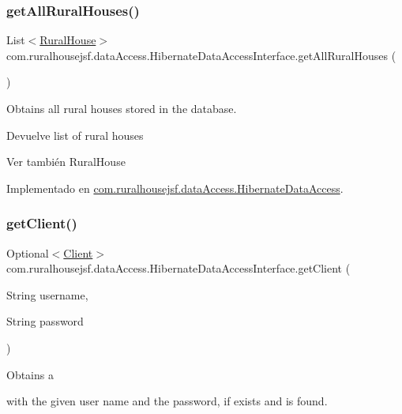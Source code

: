 \subsubsection{\texorpdfstring{getAllRuralHouses()}{getAllRuralHouses()}}
{\footnotesize\ttfamily List$<$\mbox{\hyperlink{classcom_1_1ruralhousejsf_1_1domain_1_1_rural_house}{Rural\+House}}$>$ com.\+ruralhousejsf.\+data\+Access.\+Hibernate\+Data\+Access\+Interface.\+get\+All\+Rural\+Houses (\begin{DoxyParamCaption}{ }\end{DoxyParamCaption})}

Obtains all rural houses stored in the database.

\begin{DoxyReturn}{Devuelve}
list of rural houses
\end{DoxyReturn}
\begin{DoxySeeAlso}{Ver también}
Rural\+House 
\end{DoxySeeAlso}


Implementado en \mbox{\hyperlink{classcom_1_1ruralhousejsf_1_1data_access_1_1_hibernate_data_access_acb92be47dc680218ff3102addce8ae8f}{com.\+ruralhousejsf.\+data\+Access.\+Hibernate\+Data\+Access}}.

\mbox{\label{interfacecom_1_1ruralhousejsf_1_1data_access_1_1_hibernate_data_access_interface_abf581529aefd317dffd1d2ca0906c3ac}} 
\subsubsection{\texorpdfstring{getClient()}{getClient()}}
{\footnotesize\ttfamily Optional$<$\mbox{\hyperlink{classcom_1_1ruralhousejsf_1_1domain_1_1_client}{Client}}$>$ com.\+ruralhousejsf.\+data\+Access.\+Hibernate\+Data\+Access\+Interface.\+get\+Client (\begin{DoxyParamCaption}\item[{String}]{username,  }\item[{String}]{password }\end{DoxyParamCaption})}

Obtains a
\begin{DoxyCode}{0}
\end{DoxyCode}
 with the given user name and the password, if exists and is found.


